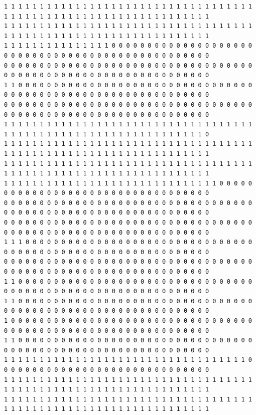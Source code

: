 \documentclass [10 pt, a4 paper]{report}
\begin{document}
\begin{lstlisting}[caption=Output of the simulation once it is finished, label={lst:code1}, frame=single]
1 1 1 1 1 1 1 1 1 1 1 1 1 1 1 1 1 1 1 1 1 1 1 1 1 1 1 1 1 1 1 1 1 1 1 1 1 1 1 1 1 1 1 1 1 1 1 1 1 1 1 1 1 1 1 1 1 1 1 1 1 1 1 1
1 1 1 1 1 1 1 1 1 1 1 1 1 1 1 1 1 1 1 1 1 1 1 1 1 1 1 1 1 1 1 1 1 1 1 1 1 1 1 1 1 1 1 1 1 1 1 1 1 1 1 1 1 1 1 1 1 1 1 1 1 1 1 1
1 1 1 1 1 1 1 1 1 1 1 1 1 1 1 0 0 0 0 0 0 0 0 0 0 0 0 0 0 0 0 0 0 0 0 0 0 0 0 0 0 0 0 0 0 0 0 0 0 0 0 0 0 0 0 0 0 0 0 0 0 0 0 0
0 0 0 0 0 0 0 0 0 0 0 0 0 0 0 0 0 0 0 0 0 0 0 0 0 0 0 0 0 0 0 0 0 0 0 0 0 0 0 0 0 0 0 0 0 0 0 0 0 0 0 0 0 0 0 0 0 0 0 0 0 0 0 0
1 1 0 0 0 0 0 0 0 0 0 0 0 0 0 0 0 0 0 0 0 0 0 0 0 0 0 0 0 0 0 0 0 0 0 0 0 0 0 0 0 0 0 0 0 0 0 0 0 0 0 0 0 0 0 0 0 0 0 0 0 0 0 0
0 0 0 0 0 0 0 0 0 0 0 0 0 0 0 0 0 0 0 0 0 0 0 0 0 0 0 0 0 0 0 0 0 0 0 0 0 0 0 0 0 0 0 0 0 0 0 0 0 0 0 0 0 0 0 0 0 0 0 0 0 0 0 0
1 1 1 1 1 1 1 1 1 1 1 1 1 1 1 1 1 1 1 1 1 1 1 1 1 1 1 1 1 1 1 1 1 1 1 1 1 1 1 1 1 1 1 1 1 1 1 1 1 1 1 1 1 1 1 1 1 1 1 1 1 1 1 0
1 1 1 1 1 1 1 1 1 1 1 1 1 1 1 1 1 1 1 1 1 1 1 1 1 1 1 1 1 1 1 1 1 1 1 1 1 1 1 1 1 1 1 1 1 1 1 1 1 1 1 1 1 1 1 1 1 1 1 1 1 1 1 1
1 1 1 1 1 1 1 1 1 1 1 1 1 1 1 1 1 1 1 1 1 1 1 1 1 1 1 1 1 1 1 1 1 1 1 1 1 1 1 1 1 1 1 1 1 1 1 1 1 1 1 1 1 1 1 1 1 1 1 1 1 1 1 1
1 1 1 1 1 1 1 1 1 1 1 1 1 1 1 1 1 1 1 1 1 1 1 1 1 1 1 1 1 1 0 0 0 0 0 0 0 0 0 0 0 0 0 0 0 0 0 0 0 0 0 0 0 0 0 0 0 0 0 0 0 0 0 0
0 0 0 0 0 0 0 0 0 0 0 0 0 0 0 0 0 0 0 0 0 0 0 0 0 0 0 0 0 0 0 0 0 0 0 0 0 0 0 0 0 0 0 0 0 0 0 0 0 0 0 0 0 0 0 0 0 0 0 0 0 0 0 0
0 0 0 0 0 0 0 0 0 0 0 0 0 0 0 0 0 0 0 0 0 0 0 0 0 0 0 0 0 0 0 0 0 0 0 0 0 0 0 0 0 0 0 0 0 0 0 0 0 0 0 0 0 0 0 0 0 0 0 0 0 0 0 0
1 1 1 0 0 0 0 0 0 0 0 0 0 0 0 0 0 0 0 0 0 0 0 0 0 0 0 0 0 0 0 0 0 0 0 0 0 0 0 0 0 0 0 0 0 0 0 0 0 0 0 0 0 0 0 0 0 0 0 0 0 0 0 0
0 0 0 0 0 0 0 0 0 0 0 0 0 0 0 0 0 0 0 0 0 0 0 0 0 0 0 0 0 0 0 0 0 0 0 0 0 0 0 0 0 0 0 0 0 0 0 0 0 0 0 0 0 0 0 0 0 0 0 0 0 0 0 0
1 1 0 0 0 0 0 0 0 0 0 0 0 0 0 0 0 0 0 0 0 0 0 0 0 0 0 0 0 0 0 0 0 0 0 0 0 0 0 0 0 0 0 0 0 0 0 0 0 0 0 0 0 0 0 0 0 0 0 0 0 0 0 0
1 1 0 0 0 0 0 0 0 0 0 0 0 0 0 0 0 0 0 0 0 0 0 0 0 0 0 0 0 0 0 0 0 0 0 0 0 0 0 0 0 0 0 0 0 0 0 0 0 0 0 0 0 0 0 0 0 0 0 0 0 0 0 0
1 0 0 0 0 0 0 0 0 0 0 0 0 0 0 0 0 0 0 0 0 0 0 0 0 0 0 0 0 0 0 0 0 0 0 0 0 0 0 0 0 0 0 0 0 0 0 0 0 0 0 0 0 0 0 0 0 0 0 0 0 0 0 0
1 1 0 0 0 0 0 0 0 0 0 0 0 0 0 0 0 0 0 0 0 0 0 0 0 0 0 0 0 0 0 0 0 0 0 0 0 0 0 0 0 0 0 0 0 0 0 0 0 0 0 0 0 0 0 0 0 0 0 0 0 0 0 0
1 1 1 1 1 1 1 1 1 1 1 1 1 1 1 1 1 1 1 1 1 1 1 1 1 1 1 1 1 1 1 1 1 1 0 0 0 0 0 0 0 0 0 0 0 0 0 0 0 0 0 0 0 0 0 0 0 0 0 0 0 0 0 0
1 1 1 1 1 1 1 1 1 1 1 1 1 1 1 1 1 1 1 1 1 1 1 1 1 1 1 1 1 1 1 1 1 1 1 1 1 1 1 1 1 1 1 1 1 1 1 1 1 1 1 1 1 1 1 1 1 1 1 1 1 1 1 1
1 1 1 1 1 1 1 1 1 1 1 1 1 1 1 1 1 1 1 1 1 1 1 1 1 1 1 1 1 1 1 1 1 1 1 1 1 1 1 1 1 1 1 1 1 1 1 1 1 1 1 1 1 1 1 1 1 1 1 1 1 1 1 1

\end{lstlisting}
\end{document}
